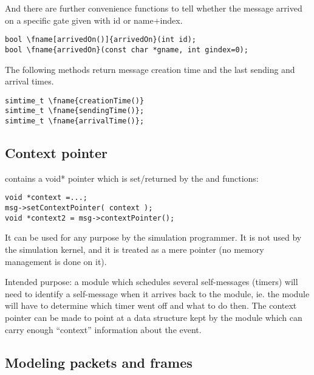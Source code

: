And there are further convenience functions to tell whether
the message arrived on a specific gate given with id or
name+index.

\begin{Verbatim}[commandchars=\\\{\}]
bool \fname[arrivedOn()]{arrivedOn}(int id);
bool \fname{arrivedOn}(const char *gname, int gindex=0);
\end{Verbatim}

The following methods return message creation time and the last sending
and arrival times.

\begin{Verbatim}[commandchars=\\\{\}]
simtime_t \fname{creationTime()}
simtime_t \fname{sendingTime()};
simtime_t \fname{arrivalTime()};
\end{Verbatim}




\subsection{Context pointer}

 contains a void* pointer which is
set/returned by the  and
 functions:

\begin{verbatim}
void *context =...;
msg->setContextPointer( context );
void *context2 = msg->contextPointer();
\end{verbatim}


It can be used for any purpose by the simulation programmer.
It is not used by the simulation kernel, and it is treated as
a mere pointer (no memory management is done on it).

Intended purpose: a module which schedules several self-messages
(timers) will need to identify a self-message when it arrives back to
the module, ie. the module will have to determine which timer went off
and what to do then. The context pointer can be
made to point at a data structure kept by the module which can carry
enough ``context'' information about the event.





\subsection{Modeling packets and frames}

